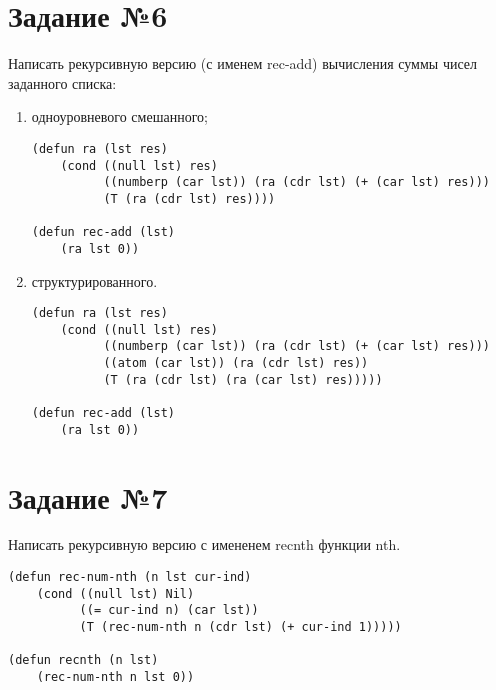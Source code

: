 \section{Задание №6}

Написать рекурсивную версию (с именем rec-add) вычисления суммы чисел
заданного списка: 
\begin{enumerate}
    \item одноуровневого смешанного;

\vspace{4mm}
\begin{minipage}{0.92\linewidth}
\begin{lstlisting}
(defun ra (lst res)
    (cond ((null lst) res)
          ((numberp (car lst)) (ra (cdr lst) (+ (car lst) res)))
          (T (ra (cdr lst) res))))

(defun rec-add (lst)
    (ra lst 0))
\end{lstlisting}
\end{minipage}

    \item структурированного.

\vspace{4mm}
\begin{minipage}{0.92\linewidth}
\begin{lstlisting}
(defun ra (lst res)
    (cond ((null lst) res)
          ((numberp (car lst)) (ra (cdr lst) (+ (car lst) res)))
          ((atom (car lst)) (ra (cdr lst) res))
          (T (ra (cdr lst) (ra (car lst) res)))))

(defun rec-add (lst)
    (ra lst 0))
\end{lstlisting}
\end{minipage}

\end{enumerate}

\section{Задание №7}

Написать рекурсивную версию с имененем recnth функции nth.

\vspace{4mm}
\begin{minipage}{0.92\linewidth}
\begin{lstlisting}
(defun rec-num-nth (n lst cur-ind)
    (cond ((null lst) Nil)
          ((= cur-ind n) (car lst))
          (T (rec-num-nth n (cdr lst) (+ cur-ind 1)))))

(defun recnth (n lst)
    (rec-num-nth n lst 0))
\end{lstlisting}
\end{minipage}

